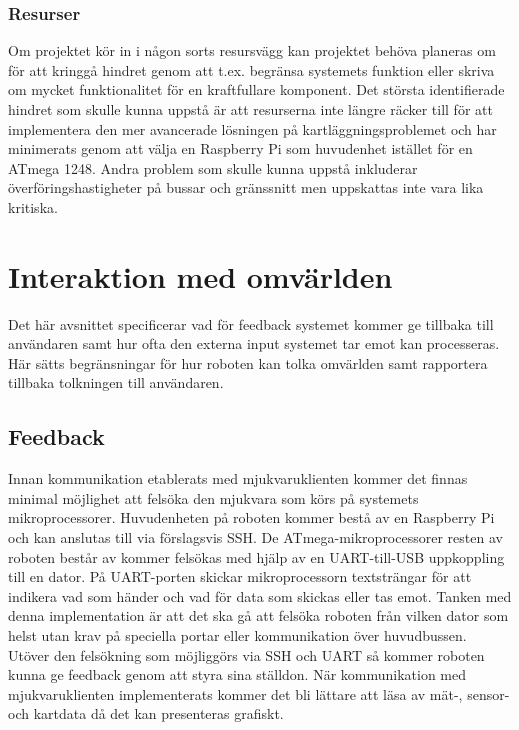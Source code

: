 \documentclass{article}
\begin{document}
\subsubsection{Resurser}
Om projektet kör in i någon sorts resursvägg kan projektet behöva planeras om för att kringgå hindret genom att t.ex. begränsa systemets funktion eller skriva om mycket funktionalitet för en kraftfullare komponent. Det största identifierade hindret som skulle kunna uppstå är att resurserna inte längre räcker till för att implementera den mer avancerade lösningen på kartläggningsproblemet och har minimerats genom att välja en Raspberry Pi som huvudenhet istället för en ATmega 1248. Andra problem som skulle kunna uppstå inkluderar överföringshastigheter på bussar och gränssnitt men uppskattas inte vara lika kritiska. 

\clearpage

\section{Interaktion med omvärlden}
Det här avsnittet specificerar vad för feedback systemet kommer ge tillbaka till användaren samt hur ofta den externa input systemet tar emot kan processeras. Här sätts begränsningar för hur roboten kan tolka omvärlden samt rapportera tillbaka tolkningen till användaren.

\subsection{Feedback}
Innan kommunikation etablerats med mjukvaruklienten kommer det finnas minimal möjlighet att felsöka den mjukvara som körs på systemets mikroprocessorer. Huvudenheten på roboten kommer bestå av en Raspberry Pi och kan anslutas till via förslagsvis SSH. De ATmega-mikroprocessorer resten av roboten består av kommer felsökas med hjälp av en UART-till-USB uppkoppling till en dator. På UART-porten skickar mikroprocessorn textsträngar för att indikera vad som händer och vad för data som skickas eller tas emot. Tanken med denna implementation är att det ska gå att felsöka roboten från vilken dator som helst utan krav på speciella portar eller kommunikation över huvudbussen.
\newline\newline
Utöver den felsökning som möjliggörs via SSH och UART så kommer roboten kunna ge feedback genom att styra sina ställdon. När kommunikation med mjukvaruklienten implementerats kommer det bli lättare att läsa av mät-, sensor- och kartdata då det kan presenteras grafiskt.
\end{document}
